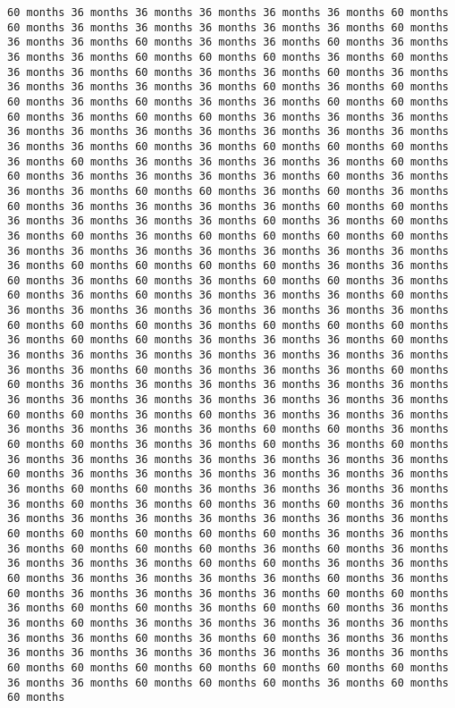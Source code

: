 \documentclass[11pt]{article}
\begin{document}
\begin{Verbatim}[commandchars=\\\{\}, frame=single, framerule=2mm, rulecolor=\color{outerrorbackground}]
60 months 36 months 36 months 36 months 36 months 36 months 60 months 60 months 36 months 36 months 36 months 36 months 36 months 60 months 36 months 36 months 60 months 36 months 36 months 60 months 36 months 36 months 36 months 60 months 60 months 60 months 36 months 60 months 36 months 36 months 60 months 36 months 36 months 60 months 36 months 36 months 36 months 36 months 36 months 60 months 36 months 60 months 60 months 36 months 60 months 36 months 36 months 60 months 60 months 60 months 36 months 60 months 60 months 36 months 36 months 36 months 36 months 36 months 36 months 36 months 36 months 36 months 36 months 36 months 36 months 60 months 36 months 60 months 60 months 60 months 36 months 60 months 36 months 36 months 36 months 36 months 60 months 60 months 36 months 36 months 36 months 36 months 60 months 36 months 36 months 36 months 60 months 60 months 36 months 60 months 36 months 60 months 36 months 36 months 36 months 36 months 60 months 60 months 36 months 36 months 36 months 36 months 60 months 36 months 60 months 36 months 60 months 36 months 60 months 60 months 60 months 60 months 36 months 36 months 36 months 36 months 36 months 36 months 36 months 36 months 60 months 60 months 60 months 60 months 36 months 36 months 60 months 36 months 60 months 36 months 60 months 60 months 36 months 60 months 36 months 60 months 36 months 36 months 36 months 60 months 36 months 36 months 36 months 36 months 36 months 36 months 36 months 60 months 60 months 60 months 36 months 60 months 60 months 60 months 36 months 60 months 60 months 36 months 36 months 36 months 60 months 36 months 36 months 36 months 36 months 36 months 36 months 36 months 36 months 36 months 60 months 36 months 36 months 36 months 60 months 60 months 36 months 36 months 36 months 36 months 36 months 36 months 36 months 36 months 36 months 36 months 36 months 36 months 36 months 60 months 60 months 36 months 60 months 36 months 36 months 36 months 36 months 36 months 36 months 36 months 60 months 60 months 36 months 60 months 60 months 36 months 36 months 60 months 36 months 60 months 36 months 36 months 36 months 36 months 36 months 36 months 36 months 60 months 36 months 36 months 36 months 36 months 36 months 36 months 36 months 60 months 60 months 36 months 36 months 36 months 36 months 36 months 60 months 36 months 60 months 36 months 60 months 36 months 36 months 36 months 36 months 36 months 36 months 36 months 36 months 60 months 60 months 60 months 60 months 60 months 36 months 36 months 36 months 60 months 60 months 60 months 36 months 60 months 36 months 36 months 36 months 36 months 60 months 60 months 36 months 36 months 60 months 36 months 36 months 36 months 36 months 60 months 36 months 60 months 36 months 36 months 36 months 36 months 60 months 60 months 36 months 60 months 60 months 36 months 60 months 60 months 36 months 36 months 60 months 36 months 36 months 36 months 36 months 36 months 36 months 36 months 60 months 36 months 60 months 36 months 36 months 36 months 36 months 36 months 36 months 36 months 36 months 36 months 60 months 60 months 60 months 60 months 60 months 60 months 60 months 36 months 36 months 60 months 60 months 60 months 36 months 60 months 60 months 
\end{Verbatim}
\end{document}
